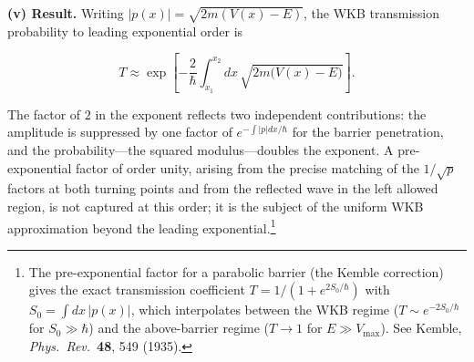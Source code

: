 \medskip\noindent\textbf{(v) Result.} Writing $|p(x)| = \sqrt{2m(V(x)-E)}$, the WKB transmission probability to leading exponential order is
\begin{linenomath}
\begin{equation}
\boxed{T \approx \exp\left[-\frac{2}{\hbar}\int_{x_1}^{x_2} dx\,\sqrt{2m\bigl(V(x)-E\bigr)}\right]} .
\label{eq:wkb-tunneling}
\end{equation}
\end{linenomath}
The factor of $2$ in the exponent reflects two independent contributions: the amplitude is suppressed by one factor of $e^{-\int|p|dx/\hbar}$ for the barrier penetration, and the probability---the squared modulus---doubles the exponent. A pre-exponential factor of order unity, arising from the precise matching of the $1/\sqrt{p}$ factors at both turning points and from the reflected wave in the left allowed region, is not captured at this order; it is the subject of the uniform WKB approximation beyond the leading exponential.\footnote{The pre-exponential factor for a parabolic barrier (the Kemble correction) gives the exact transmission coefficient $T = 1/(1 + e^{2S_0/\hbar})$ with $S_0 = \int dx\,|p(x)|$, which interpolates between the WKB regime ($T \sim e^{-2S_0/\hbar}$ for $S_0 \gg \hbar$) and the above-barrier regime ($T \to 1$ for $E \gg V_{\text{max}}$). See Kemble, \emph{Phys.\ Rev.}\ \textbf{48}, 549 (1935).}

